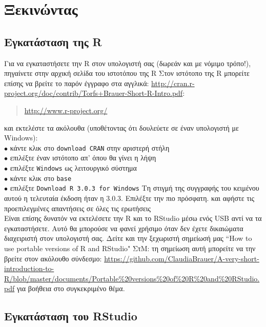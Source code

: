 \documentclass[a4paper,10pt,twocolumn]{article}
\makeatletter
\let\SF@@footnote\footnote
\def\footnote{\ifx\protect\@typeset@protect
 \expandafter\SF@@footnote
 \else
 \expandafter\SF@gobble@opt
 \fi
}
\edef\SF@gobble@opt{\noexpand\protect
 \expandafter\noexpand\csname SF@gobble@opt \endcsname}
\makeatother
\begin{document}
\section{Ξεκινώντας}

\subsection{Εγκατάσταση της R}

Για να εγκαταστήσετε την R στον υπολογιστή σας (δωρεάν και με νόμιμο τρόπο!), πηγαίνετε στην
αρχική σελίδα του ιστοτόπου της R\footnote{Στον ιστότοπο της R μπορείτε επίσης να βρείτε το παρόν έγγραφο
στα αγγλικά: \url{http://cran.r-project.org/doc/contrib/Torfs+Brauer-Short-R-Intro.pdf}}:
\begin{quote}
  \url{http://www.r-project.org/}
\end{quote}
και εκτελέστε τα ακόλουθα (υποθέτοντας ότι δουλεύετε σε έναν υπολογιστή με Windows):\\
\noindent $\bullet$ κάντε κλικ στο \texttt{download CRAN} στην αριστερή στήλη\\
\noindent $\bullet$ επιλέξτε έναν ιστότοπο  απ' όπου θα γίνει η λήψη\\
\noindent $\bullet$ επιλέξτε \texttt{Windows} ως λειτουργικό σύστημα\\
\noindent $\bullet$ κάντε κλικ στο \texttt{base}\\
\noindent $\bullet$ επιλέξτε \texttt{Download R 3.0.3 for Windows} \footnote{Τη στιγμή της
συγγραφής του κειμένου αυτού η τελευταία έκδοση ήταν η 3.0.3. Επιλέξτε την πιο πρόσφατη.} και
αφήστε τις προεπιλεγμένες απαντήσεις σε όλες τις ερωτήσεις\\

Είναι επίσης δυνατόν να εκτελέσετε την R και το RStudio μέσω ενός USB αντί να τα εγκαταστήσετε. Αυτό
θα μπορούσε να φανεί χρήσιμο όταν δεν έχετε δικαιώματα διαχειριστή στον υπολογιστή σας. Δείτε και 
την ξεχωριστή σημείωσή μας ``How to use portable versions of R and RStudio"\footnote{ΣτΜ: τη σημείωση αυτή
μπορείτε να την βρείτε στον ακόλουθο σύνδεσμο: \url{https://github.com/ClaudiaBrauer/A-very-short-introduction-to-R/blob/master/documents/Portable\%20versions\%20of\%20R\%20and\%20RStudio.pdf}} για βοήθεια στο 
συγκεκριμένο θέμα.

\subsection{Εγκατάσταση του RStudio}
\end{document}
